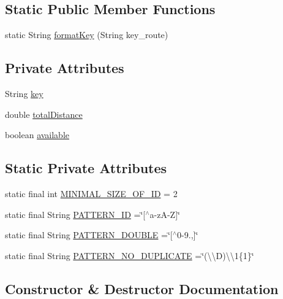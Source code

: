 \subsection*{Static Public Member Functions}
\begin{DoxyCompactItemize}
\item 
static String \hyperlink{classdomain_1_1_route_a750d0fa997e2a369cd6721316df90adf}{format\+Key} (String key\+\_\+route)
\end{DoxyCompactItemize}
\subsection*{Private Attributes}
\begin{DoxyCompactItemize}
\item 
String \hyperlink{classdomain_1_1_route_a6d8759bc34744e4cb33c16fa4d9da1ff}{key}
\item 
double \hyperlink{classdomain_1_1_route_ad5bc83b32e698504d37b664f2db9b4d8}{total\+Distance}
\item 
boolean \hyperlink{classdomain_1_1_route_a07a01f3fac2a5dc8d26d895103f1fed8}{available}
\end{DoxyCompactItemize}
\subsection*{Static Private Attributes}
\begin{DoxyCompactItemize}
\item 
static final int \hyperlink{classdomain_1_1_route_a9b2bccc9cdf0d509d2fe97fb3ba3005c}{M\+I\+N\+I\+M\+A\+L\+\_\+\+S\+I\+Z\+E\+\_\+\+O\+F\+\_\+\+ID} = 2
\item 
static final String \hyperlink{classdomain_1_1_route_a1c02b80e2b43abc5b28ccbbe1fee8317}{P\+A\+T\+T\+E\+R\+N\+\_\+\+ID} =\char`\"{}\mbox{[}$^\wedge$a-\/zA-\/Z\mbox{]}\char`\"{}
\item 
static final String \hyperlink{classdomain_1_1_route_ad18675a0f08a01ee291a9028db751e40}{P\+A\+T\+T\+E\+R\+N\+\_\+\+D\+O\+U\+B\+LE} =\char`\"{}\mbox{[}$^\wedge$0-\/9.,\mbox{]}\char`\"{}
\item 
static final String \hyperlink{classdomain_1_1_route_ab381341fcb1b712cb42c55fdb3ca02eb}{P\+A\+T\+T\+E\+R\+N\+\_\+\+N\+O\+\_\+\+D\+U\+P\+L\+I\+C\+A\+TE} =\char`\"{}(\textbackslash{}\textbackslash{}D)\textbackslash{}\textbackslash{}1\{1\}\char`\"{}
\end{DoxyCompactItemize}


\subsection{Constructor \& Destructor Documentation}
\mbox{\label{classdomain_1_1_route_a7e62f0d946cbba216309d1c603346578}} 
